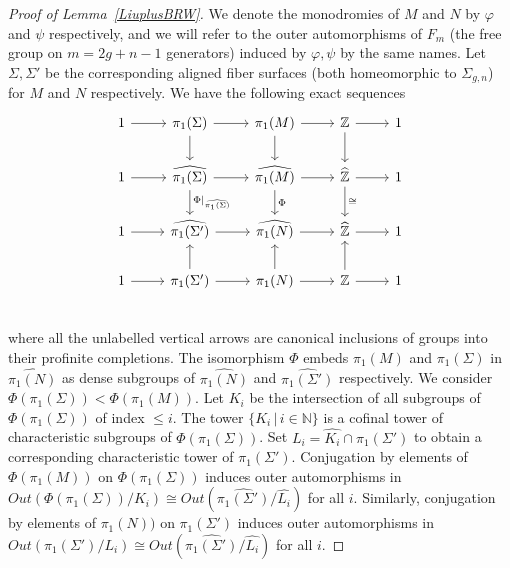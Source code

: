 \documentclass[12pt, reqno,oneside]{amsart}
\theoremstyle{definition}
\theoremstyle{plain}
\theoremstyle{TheoremNum}
\newcommand{\Z}{{\mathbb Z}}
\numberwithin{equation}{section}
\numberwithin{table}{section}
\begin{document}
\begin{proof}[Proof of Lemma~\ref{LiuplusBRW}]
   We denote the monodromies of $M$ and $N$ by $\varphi$ and $\psi$ respectively, and we will refer to the outer automorphisms of $F_m$ (the free group on $m=2g+n-1$ generators) induced by $\varphi,\psi$ by the same names. Let $\Sigma,\Sigma'$ be the corresponding aligned fiber surfaces (both homeomorphic to $\Sigma_{g,n}$) for $M$ and $N$ respectively. We have the following exact sequences 
  \[
   \begin{tikzcd}
  1 \arrow[r] &\pi_1(\Sigma)\arrow[r]\arrow[d] &\pi_1(M)\arrow[r]\arrow[d] &\Z\arrow[r]\arrow[d] & 1
    \\
    1 \arrow[r] &\widehat{\pi_1(\Sigma)}\arrow[r]\arrow[d, "\Phi|_{\widehat{\pi_1(\Sigma)}}"] &\widehat{\pi_1(M)}\arrow[r]\arrow[d, "\Phi"] &\widehat{\Z}\arrow[r]\arrow[d, "\cong"] & 1
    \\
    1 \arrow[r] &\widehat{\pi_1(\Sigma')}\arrow[r] &\widehat{\pi_1(N)}\arrow[r] &\widehat{\Z}\arrow[r] & 1
    \\
    1 \arrow[r] &\pi_1(\Sigma')\arrow[r]\arrow[u] &\pi_1(N)\arrow[r]\arrow[u] &\Z\arrow[r]\arrow[u] & 1
    \\
 \end{tikzcd}
\]
where all the unlabelled vertical arrows are canonical inclusions of groups into their profinite completions. 
\medbreak The isomorphism $\Phi$ embeds $\pi_1(M)$ and $\pi_1(\Sigma)$ in $\widehat{\pi_1(N)}$ as dense subgroups of $\widehat{\pi_1(N)}$ and $\widehat{\pi_1(\Sigma')}$ respectively. We consider $\Phi(\pi_1(\Sigma))<\Phi(\pi_1(M))$. Let $K_i$ be the intersection of all subgroups of $\Phi(\pi_1(\Sigma))$ of index $\leq i$. The tower $\{K_i\,|\,i\in\mathbb{N}\}$ is a cofinal tower of characteristic subgroups of $\Phi(\pi_1(\Sigma))$. Set $L_i=\widehat{K_i}\cap\pi_1(\Sigma')$ to obtain a corresponding characteristic tower of $\pi_1(\Sigma')$. Conjugation by elements of $\Phi(\pi_1(M))$ on $\Phi(\pi_1(\Sigma))$ induces outer automorphisms in $Out(\Phi(\pi_1(\Sigma))/K_i)\cong Out(\widehat{\pi_1(\Sigma')}/\widehat{L_i})$ for all $i$. Similarly, conjugation by elements of $\pi_1(N))$ on $\pi_1(\Sigma')$ induces outer automorphisms in $Out(\pi_1(\Sigma')/L_i)\cong Out(\widehat{\pi_1(\Sigma')}/\widehat{L_i})$ for all $i$. 

\end{proof}
\end{document}
